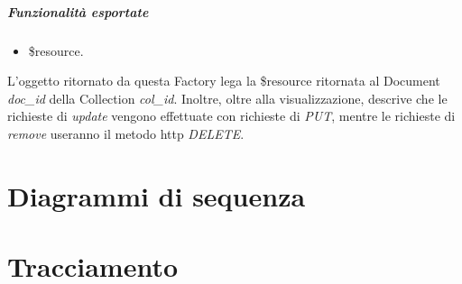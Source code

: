 \subparagraph{Funzionalità esportate}
\begin{itemize}
 \item \$resource.
\end{itemize}
L'oggetto ritornato da questa Factory lega la \$resource ritornata al Document \emph{doc_id} della Collection
\emph{col_id}. Inoltre, oltre alla visualizzazione, descrive che le richieste di \emph{update} vengono effettuate
con richieste di \emph{PUT}, mentre le richieste di \emph{remove} useranno il metodo http \emph{DELETE}.


\newpage
\section{Diagrammi di sequenza}


\appendix


\newpage


\section{Tracciamento}








